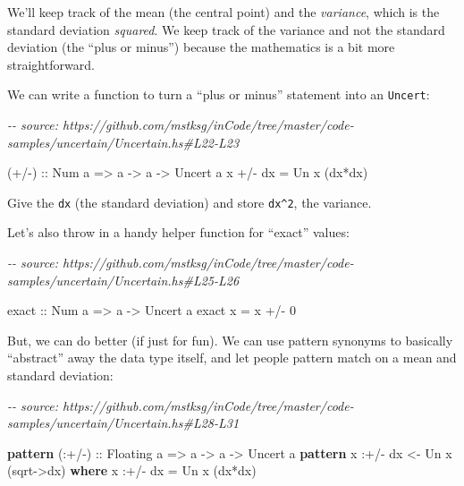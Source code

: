 \documentclass[]{article}
\newenvironment{Shaded}{}{}
\newcommand{\CommentTok}[1]{\textcolor[rgb]{0.38,0.63,0.69}{\textit{#1}}}
\newcommand{\DataTypeTok}[1]{\textcolor[rgb]{0.56,0.13,0.00}{#1}}
\newcommand{\DecValTok}[1]{\textcolor[rgb]{0.25,0.63,0.44}{#1}}
\newcommand{\FunctionTok}[1]{\textcolor[rgb]{0.02,0.16,0.49}{#1}}
\newcommand{\KeywordTok}[1]{\textcolor[rgb]{0.00,0.44,0.13}{\textbf{#1}}}
\newcommand{\NormalTok}[1]{#1}
\newcommand{\OperatorTok}[1]{\textcolor[rgb]{0.40,0.40,0.40}{#1}}
\newcommand{\OtherTok}[1]{\textcolor[rgb]{0.00,0.44,0.13}{#1}}
\begin{document}
We'll keep track of the mean (the central point) and the \emph{variance}, which
is the standard deviation \emph{squared}. We keep track of the variance and not
the standard deviation (the ``plus or minus'') because the mathematics is a bit
more straightforward.

We can write a function to turn a ``plus or minus'' statement into an
\texttt{Uncert}:

\begin{Shaded}
\begin{Highlighting}[]
\CommentTok{{-}{-} source: https://github.com/mstksg/inCode/tree/master/code{-}samples/uncertain/Uncertain.hs\#L22{-}L23}

\OtherTok{(+/{-}) ::} \DataTypeTok{Num}\NormalTok{ a }\OtherTok{=\textgreater{}}\NormalTok{ a }\OtherTok{{-}\textgreater{}}\NormalTok{ a }\OtherTok{{-}\textgreater{}} \DataTypeTok{Uncert}\NormalTok{ a}
\NormalTok{x }\OperatorTok{+/{-}}\NormalTok{ dx }\OtherTok{=} \DataTypeTok{Un}\NormalTok{ x (dx}\OperatorTok{*}\NormalTok{dx)}
\end{Highlighting}
\end{Shaded}

Give the \texttt{dx} (the standard deviation) and store \texttt{dx\^{}2}, the
variance.

Let's also throw in a handy helper function for ``exact'' values:

\begin{Shaded}
\begin{Highlighting}[]
\CommentTok{{-}{-} source: https://github.com/mstksg/inCode/tree/master/code{-}samples/uncertain/Uncertain.hs\#L25{-}L26}

\OtherTok{exact ::} \DataTypeTok{Num}\NormalTok{ a }\OtherTok{=\textgreater{}}\NormalTok{ a }\OtherTok{{-}\textgreater{}} \DataTypeTok{Uncert}\NormalTok{ a}
\NormalTok{exact x }\OtherTok{=}\NormalTok{ x }\OperatorTok{+/{-}} \DecValTok{0}
\end{Highlighting}
\end{Shaded}

But, we can do better (if just for fun). We can use pattern synonyms to
basically ``abstract'' away the data type itself, and let people pattern match
on a mean and standard deviation:

\begin{Shaded}
\begin{Highlighting}[]
\CommentTok{{-}{-} source: https://github.com/mstksg/inCode/tree/master/code{-}samples/uncertain/Uncertain.hs\#L28{-}L31}

\KeywordTok{pattern}\OtherTok{ (:+/{-}) ::} \DataTypeTok{Floating}\NormalTok{ a }\OtherTok{=\textgreater{}}\NormalTok{ a }\OtherTok{{-}\textgreater{}}\NormalTok{ a }\OtherTok{{-}\textgreater{}} \DataTypeTok{Uncert}\NormalTok{ a}
\KeywordTok{pattern}\NormalTok{ x }\OperatorTok{:+/{-}}\NormalTok{ dx }\OtherTok{\textless{}{-}} \DataTypeTok{Un}\NormalTok{ x (}\FunctionTok{sqrt}\OtherTok{{-}\textgreater{}}\NormalTok{dx)}
  \KeywordTok{where}
\NormalTok{    x }\OperatorTok{:+/{-}}\NormalTok{ dx }\OtherTok{=} \DataTypeTok{Un}\NormalTok{ x (dx}\OperatorTok{*}\NormalTok{dx)}
\end{Highlighting}
\end{Shaded}
\end{document}
